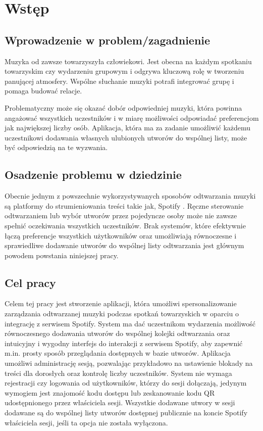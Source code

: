 \chapter{Wstęp}
\label{ch:wstep}

\section{Wprowadzenie w problem/zagadnienie}
Muzyka od zawsze towarzyszyła człowiekowi. Jest obecna na każdym spotkaniu towarzyskim czy wydarzeniu grupowym i odgrywa kluczową rolę w tworzeniu panującej atmosfery. Wspólne słuchanie muzyki potrafi integrować grupę i pomaga budować relacje. 

Problematyczny może się okazać dobór odpowiedniej muzyki, która powinna angażować wszystkich uczestników i w miarę możliwości odpowiadać preferencjom jak największej liczby osób. Aplikacja, która ma za zadanie umożliwić każdemu uczestnikowi dodawania własnych ulubionych utworów do wspólnej listy, może być odpowiedzią na te wyzwania.

\section{Osadzenie problemu w dziedzinie}
Obecnie jednym z powszechnie wykorzystywanych sposobów odtwarzania muzyki są platformy do strumieniowania treści takie jak, Spotify \cite{bib:music_report}. Ręczne sterowanie odtwarzaniem lub wybór utworów przez pojedyncze osoby może nie zawsze spełnić oczekiwania wszystkich uczestników. Brak systemów, które efektywnie łączą preferencje wszystkich użytkowników oraz umożliwiają równoczesne i sprawiedliwe dodawanie utworów do wspólnej listy odtwarzania jest głównym powodem powstania niniejszej pracy.

\section{Cel pracy}
Celem tej pracy jest stworzenie aplikacji, która umożliwi spersonalizowanie zarządzania odtwarzanej muzyki podczas spotkań towarzyskich w oparciu o integrację z serwisem Spotify. System ma dać uczestnikom wydarzenia możliwość równoczesnego dodawania utworów do wspólnej kolejki odtwarzania oraz intuicyjny i wygodny interfejs do interakcji z serwisem Spotify, aby zapewnić m.in. prosty sposób przeglądania dostępnych w bazie utworów. Aplikacja umożliwi administrację sesją, pozwalając przykładowo na ustawienie blokady na treści dla dorosłych oraz kontrolę liczby uczestników. System nie wymaga rejestracji czy logowania od użytkowników, którzy do sesji dołączają, jedynym wymogiem jest znajomość kodu dostępu lub zeskanowanie kodu QR udostępnionego przez właściciela sesji. Wszystkie dodawane utwory w sesji dodawane są do wspólnej listy utworów dostępnej publicznie na koncie Spotify właściciela sesji, jeśli ta opcja nie została wyłączona.

